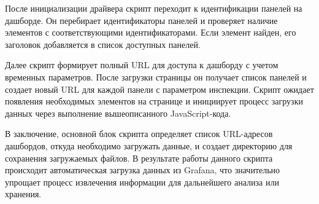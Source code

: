 После инициализации драйвера скрипт переходит к идентификации панелей на
дашборде. Он перебирает идентификаторы панелей и проверяет наличие элементов с
соответствующими идентификаторами. Если элемент найден, его заголовок
добавляется в список доступных панелей.

Далее скрипт формирует полный URL для доступа к дашборду с учетом временных
параметров. После загрузки страницы он получает список панелей и создает новый
URL для каждой панели с параметром инспекции. Скрипт ожидает появления
необходимых элементов на странице и инициирует процесс загрузки данных через
выполнение вышеописанного JavaScript-кода.

В заключение, основной блок скрипта определяет список URL-адресов дашбордов,
откуда необходимо загружать данные, и создает директорию для сохранения
загружаемых файлов. В результате работы данного скрипта происходит
автоматическая загрузка данных из Grafana, что значительно упрощает процесс
извлечения информации для дальнейшего анализа или хранения.
